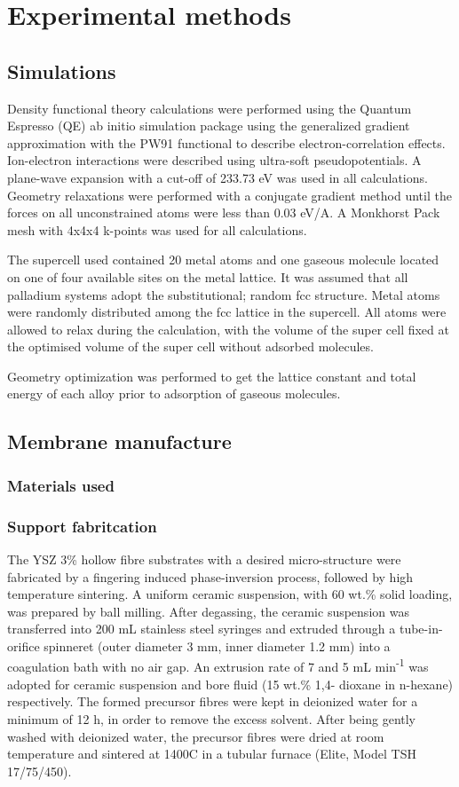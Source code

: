 \chapter{Experimental methods}

\section{Simulations}
Density functional theory calculations were performed using the Quantum Espresso (QE) ab initio simulation package using the generalized gradient approximation with the PW91 functional to describe electron-correlation effects. Ion-electron interactions were described using ultra-soft pseudopotentials. A plane-wave expansion with a cut-off of 233.73 eV was used in all calculations. Geometry relaxations were performed with a conjugate gradient method until the forces on all unconstrained atoms were less than 0.03 eV/A. A Monkhorst Pack mesh with 4x4x4 k-points was used for all calculations.

The supercell used contained 20 metal atoms and one gaseous molecule located on one of four available sites on the metal lattice. It was assumed that all palladium systems adopt the substitutional; random fcc structure. Metal atoms were randomly distributed among the fcc lattice in the supercell. All atoms were allowed to relax during the calculation, with the volume of the super cell fixed at the optimised volume of the super cell without adsorbed molecules. 

Geometry optimization was performed to get the lattice constant and total energy of each alloy prior to adsorption of gaseous molecules. 

\section{Membrane manufacture}

\subsection{Materials used}
\subsection{Support fabritcation}
The YSZ 3\% hollow fibre substrates with a desired micro-structure were fabricated by a fingering induced phase-inversion process, followed by high temperature sintering. A uniform ceramic suspension, with 60 wt.\% solid loading, was prepared by ball milling. After degassing, the ceramic suspension was transferred into 200 mL stainless steel syringes and extruded through a tube-in-orifice spinneret (outer diameter 3 mm, inner diameter 1.2 mm) into a coagulation bath with no air gap. An extrusion rate of 7 and 5 mL min\textsuperscript{-1} was adopted for ceramic suspension and bore fluid (15 wt.\% 1,4- dioxane in n-hexane) respectively. The formed precursor fibres were kept in deionized water for a minimum of 12 h, in order to remove the excess solvent. After being gently washed with deionized water, the precursor fibres were dried at room temperature and sintered at 1400\textdegree C in a tubular furnace (Elite, Model TSH 17/75/450).
